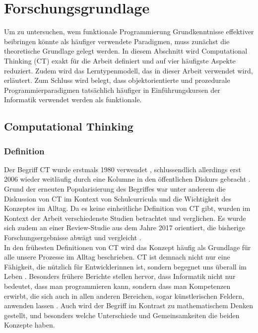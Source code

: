 \clearpage
\section{Forschungsgrundlage}
\label{sec:research}

Um zu untersuchen, wem funktionale Programmierung Grundkenntnisse effektiver beibringen könnte als häufiger verwendete Paradigmen, muss zunächst die theoretische Grundlage gelegt werden. In diesem Abschnitt wird Computational Thinking (CT) exakt für die Arbeit definiert und auf vier häufigste Aspekte reduziert. Zudem wird das Lerntypenmodell, das in dieser Arbeit verwendet wird, erläutert. Zum Schluss wird belegt, dass objektorientierte und prozedurale Programmierparadigmen tatsächlich häufiger in Einführungskursen der Informatik verwendet werden als funktionale.

\subsection{Computational Thinking}

\subsubsection{Definition}
Der Begriff CT wurde erstmals 1980 verwendet \cite{papert}, schlussendlich allerdings erst 2006 wieder weitläufig durch eine Kolumne in den öffentlichen Diskurs gebracht \cite{wing2006}.
Grund der erneuten Popularisierung des Begriffes war unter anderem die Diskussion von CT im Kontext von Schulcurricula und die Wichtigkeit des Konzeptes im Alltag.
Da es keine einheitliche Definition von CT gibt, wurden im Kontext der Arbeit verschiedenste Studien betrachtet und verglichen. Es wurde sich zudem an einer Review-Studie aus dem Jahre 2017 orientiert, die bisherige Forschungsergebnisse abwägt und vergleicht \cite{schute}.
\\
In den frühesten Definitionen von CT wird das Konzept häufig als Grundlage für alle unsere Prozesse im Alltag beschrieben. CT ist demnach nicht nur eine Fähigkeit, die nützlich für Entwicklerinnen ist, sondern begegnet uns überall im Leben \cite{khine17}. Besonders frühere Berichte stellen hervor, dass Informatik nicht nur bedeutet, dass man programmieren kann, sondern dass man Kompetenzen erwirbt, die sich auch in allen anderen Bereichen, sogar künstlerischen Feldern, anwenden lassen \cite{wing2006}.
Auch wird der Begriff im Kontrast zu mathematischem Denken gestellt, und besonders welche Unterschiede und Gemeinsamkeiten die beiden Konzepte haben.

